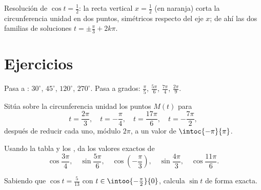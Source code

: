 \begin{omfigure}

{\small Resolución de $\cos t = \frac12$: la recta vertical
$x = \frac12$ (en naranja) corta la circunferencia unidad en dos puntos,
simétricos respecto del eje $x$; de ahí las dos familias de soluciones
$t = \pm\frac\pi3 + 2k\pi$.}
\end{omfigure}

\section{Ejercicios}

\begin{exercise}[$\star$]\label{exo:g11:trigo:1}
Pasa a : $30^\circ$, $45^\circ$, $120^\circ$, $270^\circ$. Pasa a
grados: $\frac{\pi}{5}$, $\frac{5\pi}{6}$, $\frac{7\pi}{4}$,
$\frac{2\pi}{9}$.
\end{exercise}

\begin{exercise}[$\star$]\label{exo:g11:trigo:2}
Sitúa sobre la circunferencia unidad los puntos $M(t)$ para
\[
t = \frac{2\pi}{3},\quad
t = -\frac{\pi}{4},\quad
t = \frac{17\pi}{6},\quad
t = -\frac{7\pi}{2},
\]
después de reducir cada uno, módulo $2\pi$, a un valor de
$\intoc{-\pi}{\pi}$.
\end{exercise}

\begin{exercise}[$\star$]\label{exo:g11:trigo:3}
Usando la tabla y los , da los valores exactos de
\[
\cos\frac{3\pi}{4}, \quad
\sin\frac{5\pi}{6}, \quad
\cos\left(-\frac{\pi}{3}\right), \quad
\sin\frac{4\pi}{3}, \quad
\cos\frac{11\pi}{6} .
\]
\end{exercise}

\begin{exercise}[$\star$]\label{exo:g11:trigo:4}
Sabiendo que $\cos t = \frac{5}{13}$ con
$t \in \intoo{-\frac\pi2}{0}$, calcula $\sin t$ de forma exacta.
\end{exercise}

